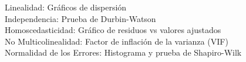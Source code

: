 \documentclass[preview]{standalone}
\begin{document}
Linealidad: Gráficos de dispersión\\Independencia: Prueba de Durbin-Watson\\Homoscedasticidad: Gráfico de residuos vs valores ajustados\\No Multicolinealidad: Factor de inflación de la varianza (VIF)\\Normalidad de los Errores: Histograma y prueba de Shapiro-Wilk\\
\end{document}
